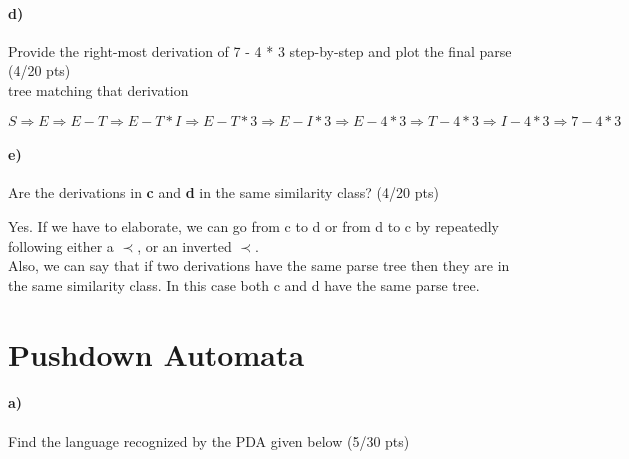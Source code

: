 \documentclass[a4paper,12pt]{article}
\begin{document}
\paragraph{d)} Provide the right-most derivation of 7 - 4 * 3 step-by-step and plot the final parse \hfill \small{(4/20 pts)} \\
 tree matching that derivation \\
 
\begin{tcolorbox}
$S\Rightarrow E\Rightarrow E-T\Rightarrow E-T*I\Rightarrow E-T*3\Rightarrow E-I*3\Rightarrow E-4*3\Rightarrow T-4*3\Rightarrow I-4*3\Rightarrow 7-4*3$ \\
\end{tcolorbox}


\paragraph{e)} Are the derivations in \textbf{c} and \textbf{d} in the same similarity class?  \hfill \small{(4/20 pts)} \\

\begin{tcolorbox}
Yes. If we have to elaborate, we can go from c to d or from d to c by repeatedly following either a $\prec$, or an inverted $\prec$. \\
Also, we can say that if two derivations have the same parse tree then they are in the same similarity class. In this case both c and d have the same parse tree.
\end{tcolorbox}


\newpage
\section{Pushdown Automata \hfill {}}

\paragraph{a)} 
Find the language recognized by the PDA given below \hfill \small{(5/30 pts)} \\
\end{document}
